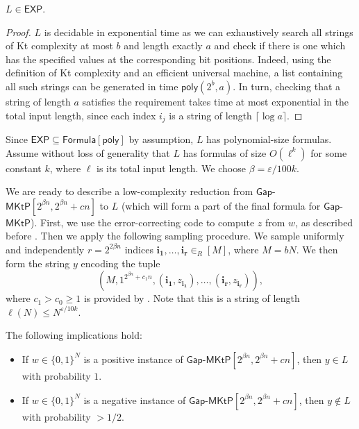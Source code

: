 \documentclass{toc}
\newcommand{\gapmktp}{\mathsf{Gap}$-$\mathsf{MKtP}}
\begin{document}
\begin{claim}\label{cl:L_in_EXP}
$L \in \mathsf{EXP}$.
\end{claim}

\begin{proof}
$L$ is decidable in exponential time as we can exhaustively search all strings of Kt complexity at most $b$ and length exactly $a$ and check if there is one which has the specified values at the corresponding bit positions. Indeed, using the definition of Kt complexity and an efficient universal machine, a list containing all such strings can be generated in time $\mathsf{poly}(2^b, a)$. 
In turn, checking that a string of length $a$ satisfies the requirement takes time at most exponential in the total input length, since each index $i_j$ is a string of length $\lceil \log a \rceil$.
\end{proof}

Since $\mathsf{EXP} \subseteq \mathsf{Formula}[\mathsf{poly}]$ by assumption, $L$ has polynomial-size formulas. Assume without loss of generality that $L$ has formulas of size $O(\ell^k)$ for some constant $k$, where $\ell$ is its total input length. We choose $\beta = \varepsilon/100k$.

We are ready to describe a low-complexity reduction from $\gapmktp[2^{\beta n}, 2^{\beta n} + cn]$ to $L$ (which will form a part of the final formula for $\gapmktp$). First, we use the error-correcting code to compute $z$ from $w$, as described before . Then we apply the following sampling procedure. We sample uniformly and independently $r = 2^{2\beta n}$ indices ${\bm{i_1}}, \ldots , {\bm{i_r}} \in_R [M]$, where $M = bN$. We then form the string $y$ encoding the tuple 
$$(M, 1^{2^{\beta n} + c_1n}, ({\bm{i_1}}, z_{{\bm{i_1}}}), \ldots, ({\bm{i_r}}, z_{{\bm{i_r}}})),$$ 
where $c_1 > c_0 \geq 1$ is provided by . Note that this is a string of length $\ell(N) \leq N^{\varepsilon/10k}$.

\begin{claim}\label{cl:correctness_reduction}
The following implications hold:
\vspace{0.2cm}
\begin{itemize}
\item[(\emph{a})] If $w \in \{0,1\}^N$ is a positive instance of $\gapmktp[2^{\beta n}, 2^{\beta n} + cn]$, then $y \in L$ with probability $1$.
\item[(\emph{b})] If $w \in \{0,1\}^N$ is a negative instance of $\gapmktp[2^{\beta n}, 2^{\beta n} + cn]$, then $y \notin L$ with probability $> 1/2$.
\end{itemize}
\end{claim}
\end{document}
